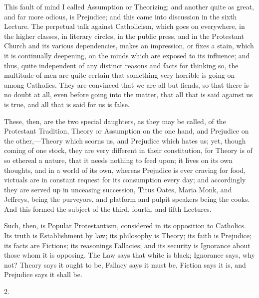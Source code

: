 This fault of mind I called Assumption or Theorizing;
and another quite as great, and far more odious, is
Prejudice; and this came into discussion in the sixth
Lecture. The perpetual talk against Catholicism, which
goes on everywhere, in the higher classes, in literary
circles, in the public press, and in the Protestant
Church and its various dependencies, makes an impression,
or fixes a stain, which it is continually deepening, on
the minds which are exposed to its influence; and thus,
quite independent of any distinct reasons and facts for
thinking so, the multitude of men are quite certain that
something very horrible is going on among Catholics. They
are convinced that we are all but fiends, so that there
is no doubt at all, even before going into the matter,
that all that is said against us is true, and all that is
said for us is false.

These, then, are the two special daughters, as they may be called, of the Protestant Tradition, Theory or
Assumption on the one hand, and Prejudice on the
other,—Theory which scorns us, and Prejudice which
hates us; yet, though coming of one stock, they are very
different in their constitution, for Theory is of so
ethereal a nature, that it needs nothing to feed upon; it
lives on its own thoughts, and in a world of its own,
whereas Prejudice is ever craving for food, victuals are
in constant request for its consumption every day; and
accordingly they are served up in unceasing succession,
Titus Oates, Maria Monk, and Jeffreys, being the
purveyors, and platform and pulpit speakers being the
cooks. And this formed the subject of the third, fourth,
and fifth Lectures.

Such, then, is Popular Protestantism, considered in
its opposition to Catholics. Its truth is Establishment
by law; its philosophy is Theory; its faith is Prejudice;
its facts are Fictions; its reasonings Fallacies; and its
security is Ignorance about those whom it is opposing.
The Law says that white is black; Ignorance says, why
not? Theory says it ought to be, Fallacy says it must be,
Fiction says it is, and Prejudice says it shall be.

2.

